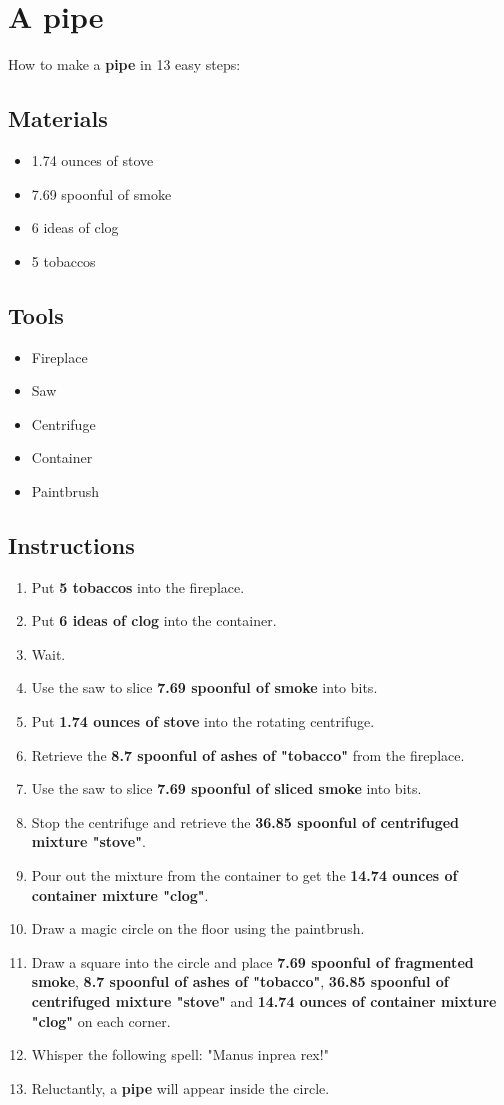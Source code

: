 \documentclass{article}
\begin{document}
\section{A pipe}How to make a \textbf{pipe} in 13 easy steps:

\subsection{Materials}\begin{itemize}
\item 
1.74 ounces of stove
\item 
7.69 spoonful of smoke
\item 
6 ideas of clog
\item 
5 tobaccos
\end{itemize}
\subsection{Tools}\begin{itemize}
\item 
Fireplace
\item 
Saw
\item 
Centrifuge
\item 
Container
\item 
Paintbrush
\end{itemize}
\subsection{Instructions}\begin{enumerate}
\item 
Put \textbf{5 tobaccos} into the fireplace.
\item 
Put \textbf{6 ideas of clog} into the container.
\item 
Wait.
\item 
Use the saw to slice \textbf{7.69 spoonful of smoke} into bits.
\item 
Put \textbf{1.74 ounces of stove} into the rotating centrifuge.
\item 
Retrieve the \textbf{8.7 spoonful of ashes of "tobacco"} from the fireplace.
\item 
Use the saw to slice \textbf{7.69 spoonful of sliced smoke} into bits.
\item 
Stop the centrifuge and retrieve the \textbf{36.85 spoonful of centrifuged mixture "stove"}.
\item 
Pour out the mixture from the container to get the \textbf{14.74 ounces of container mixture "clog"}.
\item 
Draw a magic circle on the floor using the paintbrush.
\item 
Draw a square into the circle and place \textbf{7.69 spoonful of fragmented smoke}, \textbf{8.7 spoonful of ashes of "tobacco"}, \textbf{36.85 spoonful of centrifuged mixture "stove"} and \textbf{14.74 ounces of container mixture "clog"} on each corner.
\item 
Whisper the following spell: "Manus inprea rex!"
\item 
Reluctantly, a \textbf{pipe} will appear inside the circle.
\end{enumerate}
\newpage
\end{document}
